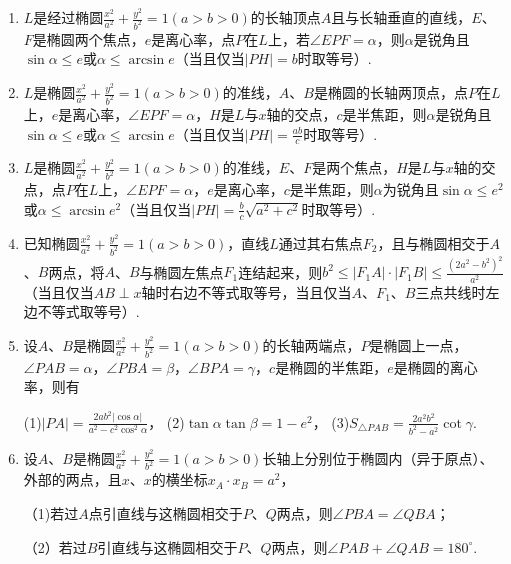 \documentclass{article}
\begin{document}
\begin{enumerate}[label=\arabic*.]
\item $L$是经过椭圆$\frac{x^2}{a^2} + \frac{y^2}{b^2} = 1 \left(a > b > 0\right)$的长轴顶点$A$且与长轴垂直的直线，$E$、$F$是椭圆两个焦点，$e$是离心率，点$P$在$L$上，若$\angle EPF=\alpha$，则$\alpha$是锐角且$\sin\alpha\leq e$或$\alpha\leq \arcsin e$（当且仅当$\left|PH\right|=b$时取等号）. 

\item $L$是椭圆$\frac{x^2}{a^2} + \frac{y^2}{b^2} = 1 \left(a > b > 0\right)$的准线，$A$、$B$是椭圆的长轴两顶点，点$P$在$L$上，$e$是离心率，$\angle EPF=\alpha$，$H$是$L$与$x$轴的交点，$c$是半焦距，则$\alpha$是锐角且$\sin\alpha\leq e$或$\alpha\leq \arcsin e$（当且仅当$\left|PH\right|=\frac{ab}{c}$时取等号）. 

\item $L$是椭圆$\frac{x^2}{a^2} + \frac{y^2}{b^2} = 1 \left(a > b > 0\right)$的准线，$E$、$F$是两个焦点，$H$是$L$与$x$轴的交点，点$P$在$L$上，$\angle EPF = \alpha$，$e$是离心率，$c$是半焦距，则$\alpha$为锐角且$\sin\alpha\leq e^2$或$\alpha\leq \arcsin e^2$（当且仅当$\left|PH\right|=\frac{b}{c}\sqrt{a^2+c^2}$时取等号）. 

\item 已知椭圆$\frac{x^2}{a^2} + \frac{y^2}{b^2} = 1 \left(a > b > 0\right)$，直线$L$通过其右焦点$F_2$，且与椭圆相交于$A$、$B$两点，将$A$、$B$与椭圆左焦点$F_1$连结起来，则$b^2\leq \left|F_1A \right|\cdot\left|F_1B \right|\leq \frac{\left(2a^2-b^2\right)^2}{a^2}$（当且仅当$AB \perp x$轴时右边不等式取等号，当且仅当$A$、$F_1$、$B$三点共线时左边不等式取等号）. 

\item 设$A$、$B$是椭圆$\frac{x^2}{a^2} + \frac{y^2}{b^2} = 1 \left(a > b > 0\right)$的长轴两端点，$P$是椭圆上一点，$\angle PAB = \alpha$，$\angle PBA = \beta$，$\angle BPA = \gamma$，$c$是椭圆的半焦距，$e$是椭圆的离心率，则有

(1)$\left|PA \right| = \frac{2ab^2\left|\cos\alpha\right|}{a^2-c^2\cos^2\alpha}$，
(2)$\tan\alpha\tan\beta=1-e^2$，
(3)$S_{\triangle PAB} = \frac{2a^2b^2}{b^2-a^2}\cot\gamma$.

\item 设$A$、$B$是椭圆$\frac{x^2}{a^2} + \frac{y^2}{b^2} = 1 \left(a > b > 0\right)$长轴上分别位于椭圆内（异于原点）、外部的两点，且$x$、$x$的横坐标$x_A\cdot x_B=a^2$，

（1)若过$A$点引直线与这椭圆相交于$P$、$Q$两点，则$\angle PBA=\angle QBA$；

（2）若过$B$引直线与这椭圆相交于$P$、$Q$两点，则$\angle PAB+\angle QAB=180^\circ$. 


\end{enumerate}
\end{document}
